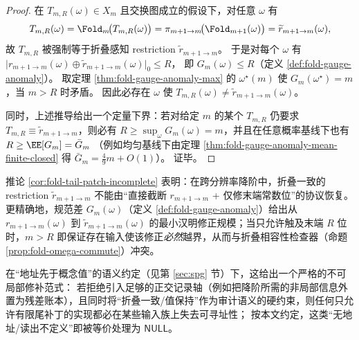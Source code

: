 \begin{proof}
在 \(T_{m,R}(\omega)\in X_m\) 且交换图成立的假设下，对任意 \(\omega\) 有
\[
T_{m,R}(\omega)
=\Fold_m\!\bigl(T_{m,R}(\omega)\bigr)
=\pi_{m+1\to m}\!\bigl(\Fold_{m+1}(\omega)\bigr)
=\widetilde r_{m+1\to m}(\omega),
\]
故 \(T_{m,R}\) 被强制等于折叠感知 restriction \(\widetilde r_{m+1\to m}\)。
于是对每个 \(\omega\) 有
\(
\bigl|r_{m+1\to m}(\omega)\oplus \widetilde r_{m+1\to m}(\omega)\bigr|_0\le R
\)，
即 \(G_m(\omega)\le R\)（定义 \ref{def:fold-gauge-anomaly}）。
取定理 \ref{thm:fold-gauge-anomaly-max} 的 \(\omega^\star(m)\) 使 \(G_m(\omega^\star)=m\)，当 \(m>R\) 时矛盾。
因此必存在 \(\omega\) 使 \(T_{m,R}(\omega)\neq \widetilde r_{m+1\to m}(\omega)\)。
\par
同时，上述推导给出一个定量下界：若对给定 \(m\) 的某个 \(T_{m,R}\) 仍要求 \(T_{m,R}\equiv \widetilde r_{m+1\to m}\)，则必有
\(
R\ge \sup_{\omega}G_m(\omega)=m
\)，并且在任意概率基线下也有
\(
R\ge \EE[G_m]=\bar G_m
\)
（例如均匀基线下由定理 \ref{thm:fold-gauge-anomaly-mean-finite-closed} 得 \(\bar G_m=\frac49m+O(1)\)）。
证毕。
\end{proof}

\begin{remark}\label{rem:fold-tail-patch-null-nonlocal}
推论 \ref{cor:fold-tail-patch-incomplete} 表明：在跨分辨率降阶中，折叠一致的 restriction \(\widetilde r_{m+1\to m}\) 不能由“直接截断 \(r_{m+1\to m}\) + 仅修末端常数位”的协议恢复。
更精确地，规范差 \(G_m(\omega)\)（定义 \ref{def:fold-gauge-anomaly}）给出从 \(r_{m+1\to m}(\omega)\) 到 \(\widetilde r_{m+1\to m}(\omega)\) 的最小汉明修正规模；当只允许触及末端 \(R\) 位时，\(m>R\) 即保证存在输入使该修正\emph{必然}越界，从而与折叠相容性检查器（命题 \ref{prop:fold-omega-commute}）冲突。
\par
在“地址先于概念值”的语义约定（见第 \ref{sec:spg} 节）下，这给出一个严格的不可局部修补范式：
若拒绝引入足够的正交记录轴（例如把降阶所需的非局部信息外置为残差账本），且同时将“折叠一致/值保持”作为审计语义的硬约束，则任何只允许有限尾补丁的实现都必在某些输入族上失去可寻址性；
按本文约定，这类“无地址/读出不定义”即被等价处理为 \(\mathsf{NULL}\)。
\end{remark}

